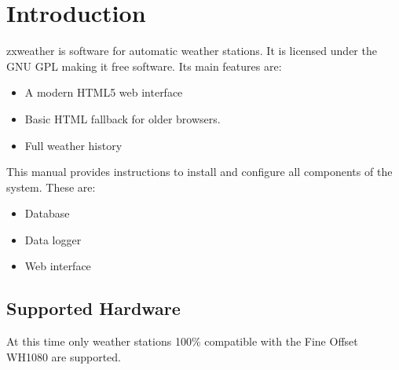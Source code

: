\documentclass[a4paper,10pt,draft]{book}
\newcommand{\partnumber}{\ifthenelse{\isundefined{\projectnum}}{}{\projectnum-\docnum	\ifthenelse{\equal{\docrev}{001}}{}{.\docrev}}}
\begin{document}

\ifthenelse{\isundefined{\ordernumber}}{

\title{\doctitle{} - \docsubtitle}
\author{\docauthor}
}{

\title{\doctitle}
\subtitle{\docsubtitle}
\titleabstract{\docabstract}
\ordernumber{\partnumber}
\updateinfo{\docupdateinfo}
\osinfo{\docosver}
\swversion{\docswver}
\titlecopyright{\doccopyright}
\licensestatement{\doclicense}
}
\date{\docdate}

\maketitle

\clearpage

\tableofcontents
\clearpage


\chapter{Introduction}
\setcounter{page}{1}

zxweather is software for automatic weather stations. It is licensed under the GNU GPL making it free software. Its main features are:
\begin{itemize}
\item A modern HTML5 web interface
\item Basic HTML fallback for older browsers.
\item Full weather history
\end{itemize}

This manual provides instructions to install and configure all components of the system. These are:
\begin{itemize}
\item Database
\item Data logger
\item Web interface
\end{itemize}

\section{Supported Hardware}
At this time only weather stations 100\% compatible with the Fine Offset WH1080 are supported.
\end{document}
